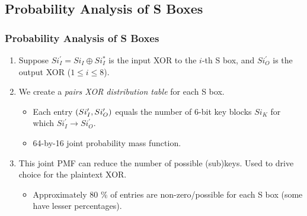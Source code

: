 \documentclass{beamer}
\begin{document}
	\subsection{Probability Analysis of S Boxes}
	
	\begin{frame}
		\frametitle{Probability Analysis of S Boxes}
		\begin{enumerate}
			\item Suppose \(Si_I^\prime = Si_I \oplus Si_I^*\) is the input XOR
			to the \(i\)-th S box, and \(Si_O^\prime\) is the output XOR (\(1
			\le i \le 8\)).
			\item<2-> We create a \emph{pairs XOR distribution table} for each S
			box.
			\begin{itemize}
				\item Each entry \((Si_I^\prime, Si_O^\prime)\) equals the
				number of 6-bit key blocks \(Si_K\) for which \(Si_I^\prime
				\rightarrow Si_O^\prime\).
				\item 64-by-16 joint probability mass function.
			\end{itemize}
			\item<3-> This joint PMF can reduce the number of possible
			(sub)keys. Used to drive choice for the plaintext XOR.
			\begin{itemize}
				\item Approximately 80 \% of entries are non-zero/possible for
				each S box (some have lesser percentages).
			\end{itemize}
		\end{enumerate}
	\end{frame}
\end{document}
